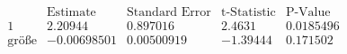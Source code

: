 \[\begin{array}{l|llll}
 \text{} & \text{Estimate} & \text{Standard Error} & \text{t-Statistic} & \text{P-Value} \\
\hline
 1 & 2.20944 & 0.897016 & 2.4631 & 0.0185496 \\
 \text{gr{\" o}{\ss}e} & -0.00698501 & 0.00500919 & -1.39444 & 0.171502 \\
\end{array}\]

